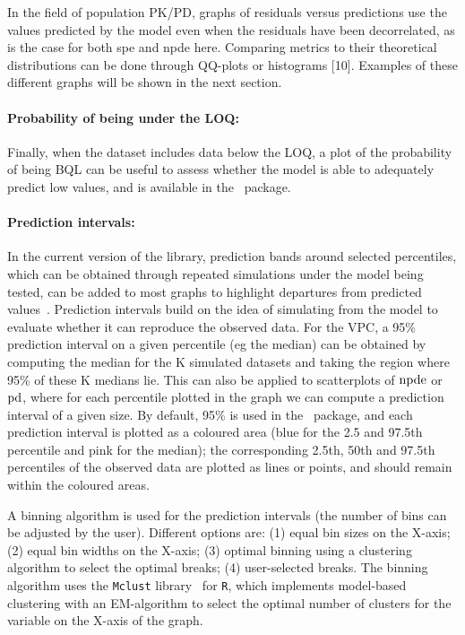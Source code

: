 In the field of population PK/PD, graphs of residuals versus predictions use the values predicted by the model even when the residuals have been decorrelated, as is the case for both spe and npde here. Comparing metrics to their theoretical distributions can be done through QQ-plots or histograms [10]. Examples of these different graphs will be shown in the next section.

\paragraph{Probability of being under the LOQ:} Finally, when the dataset includes data below the LOQ, a plot of the probability of being BQL can be useful to assess whether the model is able to adequately predict low values, and is available in the \npde~package.

\paragraph{Prediction intervals:} In the current version of the library, prediction bands around selected percentiles, which can be obtained through repeated simulations under the model being tested, can be added to most graphs to highlight departures from predicted values~\cite{Comets10}. Prediction intervals build on the idea of simulating from the model to evaluate whether it can reproduce the observed data. For the VPC, a 95\% prediction interval on a given percentile (eg the median) can be obtained by computing the median for the K simulated datasets and taking the region where 95\% of these K medians lie. This can also be applied to scatterplots of ${\rm npde}$ or ${\rm pd}$, where for each percentile plotted in the graph we can compute a prediction interval of a given size. By default, 95\% is used in the \npde~package, and each prediction interval is plotted as a coloured area (blue for the 2.5 and 97.5th percentile and pink for the median); the corresponding 2.5th, 50th and 97.5th percentiles of the observed data are plotted as 
lines or points, and should remain within the coloured areas.

A binning algorithm is used for the prediction intervals (the number of bins can be adjusted by the user). Different options are: (1) equal bin sizes on the X-axis; (2) equal bin widths on the X-axis; (3) optimal binning using a clustering algorithm to select the optimal breaks; (4) user-selected breaks. The binning algorithm uses the \texttt{Mclust} library~\cite{Fraley02,Fraley06} for \texttt{R}, which implements model-based clustering with an EM-algorithm to select the optimal number of clusters for the variable on the X-axis of the graph.

